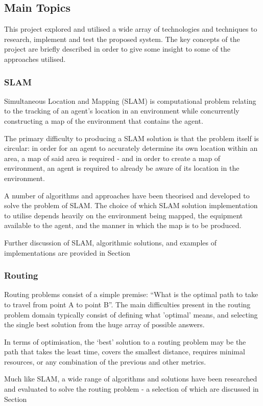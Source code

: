 \subsection{Main Topics}
This project explored and utilised a wide array of technologies and techniques
to research, implement and test the proposed system.
The key concepts of the project are briefly described in order to give some
insight to some of the approaches utilised.

\subsubsection{SLAM}
Simultaneous Location and Mapping (SLAM) is computational problem relating
to the tracking of an agent's location in an environment while concurrently
constructing a map of the environment that contains the agent.

The primary difficulty to producing a SLAM solution is that the problem itself
is circular: in order for an agent to accurately determine its own location
within an area, a map of said area is required - and in order to create a map
of environment, an agent is required to already be aware of its location in the
environment.

A number of algorithms and approaches have been theorised and developed to
solve the problem of SLAM.
The choice of which SLAM solution implementation to utilise depends heavily
on the environment being mapped, the equipment available to the agent, and the
manner in which the map is to be produced.

Further discussion of SLAM, algorithmic solutions, and examples of
implementations are provided in Section 


\subsubsection{Routing}
Routing problems consist of a simple premise: ``What is the optimal path to
take to travel from point A to point B''.
The main difficulties present in the routing problem domain typically consist of
defining what 'optimal' means, and selecting the single best solution from the
huge array of possible answers.

In terms of optimisation, the `best' solution to a routing problem may be the
path that takes the least time, covers the smallest distance, requires minimal
resources, or any combination of the previous and other metrics.

Much like SLAM, a wide range of algorithms and solutions have been researched
and evaluated to solve the routing problem - a selection of which are
discussed in Section 


